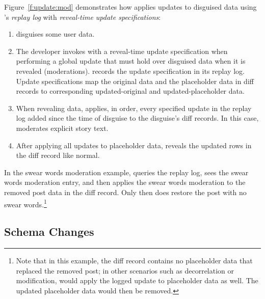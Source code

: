 %
Figure~\ref{f:update:mod} demonstrates how \sys applies updates to
disguised data using \sys's \emph{replay log} with \emph{reveal-time
update specifications}:
\begin{enumerate}[nosep]
    \item[(1)] \sys disguises some user data.
    \item[(2)] The developer invokes \sys with a reveal-time
        update specification when 
performing a global update that must hold over disguised data when it is
        revealed (\eg moderations). \sys records the update specification in its
        replay log. Update specifications map the original data and the
        placeholder data in diff records to corresponding updated-original and
        updated-placeholder data. 
    \item[(3)] When revealing data, \sys applies, in order, every specified
        update in the
        replay log added since the time of disguise to the disguise's diff
        records. In this case, \sys moderates explicit story text.
\item[(4)] After applying all updates to placeholder data, \sys reveals the
    updated rows in the diff record like normal.
\end{enumerate}
%
%
%
In the swear words moderation example, \sys queries the replay log, sees
the swear words moderation entry, and then applies the swear words moderation to
the removed post data in the diff record. Only then does \sys restore the post
with no swear words.\footnote{Note that in this example, the diff
record contains no placeholder data that replaced the removed post; in other
scenarios such as decorrelation or modification, \sys would apply the logged
update to placeholder data as well. The updated placeholder data would then be
removed.}

\subsection{Schema Changes}

